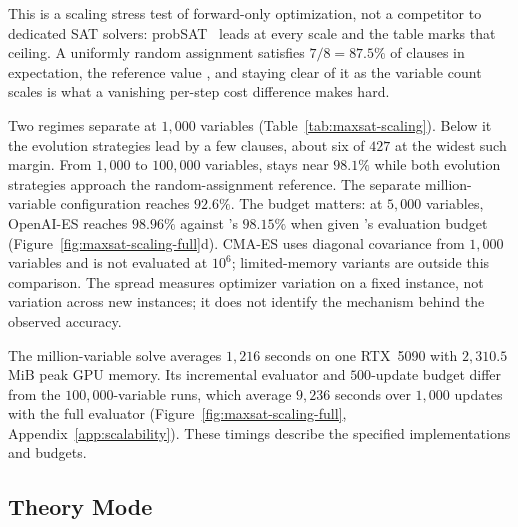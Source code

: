This is a scaling stress test of forward-only optimization, not a competitor to
dedicated SAT solvers: probSAT~\citep{balint2013probsat} leads at every scale and the
table marks that ceiling. A uniformly random assignment satisfies $7/8=87.5\%$ of clauses in
expectation, the reference value \citep{johnson1974approximation}, and staying clear of it
as the variable count scales is what a vanishing per-step cost difference makes hard.

Two regimes separate at $1{,}000$ variables (Table~\ref{tab:maxsat-scaling}). Below it
the evolution strategies lead by a few clauses, about six of $427$ at the widest such
margin. From $1{,}000$ to $100{,}000$ variables, \sysname{} stays near $98.1\%$
while both evolution strategies approach the random-assignment reference.
The separate million-variable configuration reaches $92.6\%$.
The budget matters: at $5{,}000$ variables, OpenAI-ES reaches $98.96\%$
against \sysname{}'s $98.15\%$ when given \sysname{}'s evaluation
budget (Figure~\ref{fig:maxsat-scaling-full}d). CMA-ES uses diagonal covariance from $1{,}000$ variables and
is not evaluated at $10^6$; limited-memory variants
\citep{loshchilov2017lmcma,akimoto2020ddcma} are outside this comparison.
The spread measures optimizer variation on a fixed instance, not
variation across new instances; it does not identify the mechanism
behind the observed accuracy.

The million-variable solve averages $1{,}216$ seconds on one RTX~5090
with $2{,}310.5$\,MiB peak GPU memory. Its incremental evaluator and
$500$-update budget differ from the $100{,}000$-variable runs, which
average $9{,}236$ seconds over $1{,}000$ updates with the full evaluator
(Figure~\ref{fig:maxsat-scaling-full}, Appendix~\ref{app:scalability}).
These timings describe the specified implementations and budgets.

\subsection{Theory Mode}\label{sec:theory-mode}

